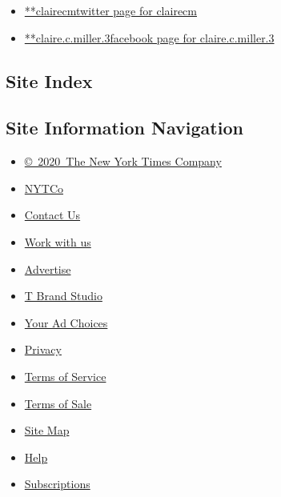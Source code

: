 \begin{itemize}
\tightlist
\item
  \href{https://twitter.com/clairecm}{**clairecmtwitter page for
  clairecm}
\item
  \href{https://www.facebookcorewwwi.onion/claire.c.miller.3}{**claire.c.miller.3facebook
  page for claire.c.miller.3}
\end{itemize}

\hypertarget{site-index}{%
\subsection{Site Index}\label{site-index}}

\hypertarget{site-information-navigation}{%
\subsection{Site Information
Navigation}\label{site-information-navigation}}

\begin{itemize}
\tightlist
\item
  \href{https://help.nytimes3xbfgragh.onion/hc/en-us/articles/115014792127-Copyright-notice}{©~2020~The
  New York Times Company}
\end{itemize}

\begin{itemize}
\tightlist
\item
  \href{https://www.nytco.com/}{NYTCo}
\item
  \href{https://help.nytimes3xbfgragh.onion/hc/en-us/articles/115015385887-Contact-Us}{Contact
  Us}
\item
  \href{https://www.nytco.com/careers/}{Work with us}
\item
  \href{https://nytmediakit.com/}{Advertise}
\item
  \href{http://www.tbrandstudio.com/}{T Brand Studio}
\item
  \href{https://www.nytimes3xbfgragh.onion/privacy/cookie-policy\#how-do-i-manage-trackers}{Your
  Ad Choices}
\item
  \href{https://www.nytimes3xbfgragh.onion/privacy}{Privacy}
\item
  \href{https://help.nytimes3xbfgragh.onion/hc/en-us/articles/115014893428-Terms-of-service}{Terms
  of Service}
\item
  \href{https://help.nytimes3xbfgragh.onion/hc/en-us/articles/115014893968-Terms-of-sale}{Terms
  of Sale}
\item
  \href{https://spiderbites.nytimes3xbfgragh.onion}{Site Map}
\item
  \href{https://help.nytimes3xbfgragh.onion/hc/en-us}{Help}
\item
  \href{https://www.nytimes3xbfgragh.onion/subscription?campaignId=37WXW}{Subscriptions}
\end{itemize}
